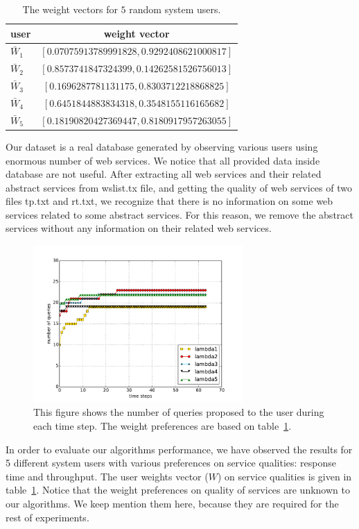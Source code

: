 \documentclass[10pt,journal,compsoc]{IEEEtran}
\begin{document}
\begin{table}
\begin{tabular}{ l | c | }
  user & weight vector \\
  \toprule
   $\bar{W}_1$ & $[0.07075913789991828, 0.9292408621000817]$ \\
   $\bar{W}_2$ & $[0.8573741847324399, 0.14262581526756013]$ \\
   $\bar{W}_3$ & $[0.1696287781131175, 0.8303712218868825]$ \\
   $\bar{W}_4$ & $[0.6451844883834318, 0.3548155116165682]$\\
   $\bar{W}_5$ & $ [0.18190820427369447, 0.8180917957263055]$\\ 
 \end{tabular} 
 \caption{The weight vectors for $5$ random system users.} 
 \label{table:weights}
\end{table}

Our dataset is a real database generated by observing various users using enormous number of web services. We notice that all provided data inside database are not useful. After extracting all web services and their related abstract services from wslist.tx file, and getting the quality of web services of two files tp.txt and rt.txt, we recognize that there is no information on some web services related to some abstract services. For this reason, we remove the abstract services without any information on their related web services. 

\begin{figure}[t]
\includegraphics[width=8cm]{graphs/query-complete}
\caption{This figure shows the number of queries proposed to the user during each time step. The weight preferences are based on table~\ref{table:weights}.}
\centering
\label{fig:queries-vs-timestep}
\end{figure}


In order to evaluate our algorithms performance, we have observed the results for 5 different system users with various preferences on service qualities: response time and throughput. The user weights vector ($W$) on service qualities is given in table~\ref{table:weights}. Notice that the weight preferences on quality of services are unknown to our algorithms. We keep mention them here, because they are required for the rest of experiments. 
\end{document}
